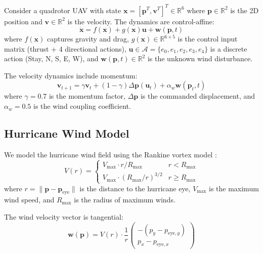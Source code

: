 \documentclass[12pt,a4paper,twocolumn]{article}
\newcommand{\cA}{\mathcal{A}}
\newcommand{\R}{\mathbb{R}}
\newcommand{\vect}[1]{\mathbf{#1}}
\begin{document}
Consider a quadrotor UAV with state $\vect{x} = [\vect{p}^T, \vect{v}^T]^T \in \R^6$ where $\vect{p} \in \R^2$ is the 2D position and $\vect{v} \in \R^2$ is the velocity. The dynamics are control-affine:
\begin{equation}
    \dot{\vect{x}} = f(\vect{x}) + g(\vect{x})\vect{u} + \vect{w}(\vect{p}, t)
    \label{eq:dynamics}
\end{equation}
where $f(\vect{x})$ captures gravity and drag, $g(\vect{x}) \in \R^{6 \times 5}$ is the control input matrix (thrust + 4 directional actions), $\vect{u} \in \cA = \{e_0, e_1, e_2, e_3, e_4\}$ is a discrete action (Stay, N, S, E, W), and $\vect{w}(\vect{p}, t) \in \R^2$ is the unknown wind disturbance.

The velocity dynamics include momentum:
\begin{equation}
    \vect{v}_{t+1} = \gamma \vect{v}_t + (1 - \gamma) \Delta\vect{p}(\vect{u}_t) + \alpha_w \vect{w}(\vect{p}_t, t)
\end{equation}
where $\gamma = 0.7$ is the momentum factor, $\Delta\vect{p}$ is the commanded displacement, and $\alpha_w = 0.5$ is the wind coupling coefficient.

\subsection{Hurricane Wind Model}
\label{sec:wind_model}

We model the hurricane wind field using the Rankine vortex model \citep{Holland2010}:
\begin{equation}
    V(r) = \begin{cases}
        V_{\max} \cdot r / R_{\max} & r < R_{\max} \\
        V_{\max} \cdot (R_{\max}/r)^{3/2} & r \geq R_{\max}
    \end{cases}
    \label{eq:rankine}
\end{equation}
where $r = \|\vect{p} - \vect{p}_{\text{eye}}\|$ is the distance to the hurricane eye, $V_{\max}$ is the maximum wind speed, and $R_{\max}$ is the radius of maximum winds.

The wind velocity vector is tangential:
\begin{equation}
    \vect{w}(\vect{p}) = V(r) \cdot \frac{1}{r} \begin{pmatrix} -(p_y - p_{\text{eye},y}) \\ p_x - p_{\text{eye},x} \end{pmatrix}
    \label{eq:wind_vec}
\end{equation}
\end{document}
